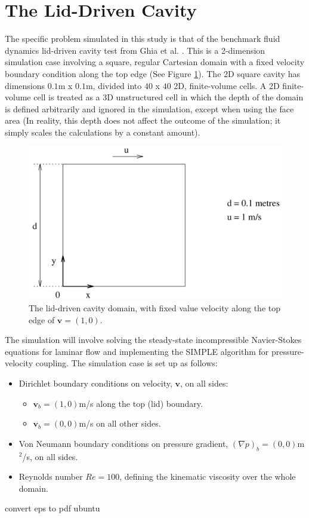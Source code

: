 \documentclass[final,3p,times,twocolumn]{elsarticle}
\begin{document}
\section{The Lid-Driven Cavity}
The specific problem simulated in this study is that of the benchmark fluid dynamics lid-driven cavity test from Ghia et al. \cite{Ghia1982High-ReMethod}. This is a 2-dimension simulation case involving a square, regular Cartesian domain with a fixed velocity boundary condition along the top edge (See Figure \ref{fig:lid-driven}). The 2D square cavity has dimensions $0.1$m x $0.1$m, divided into $40$ x $40$ 2D, finite-volume cells. A 2D finite-volume cell is treated as a 3D unstructured cell in which the depth of the domain is defined arbitrarily and ignored in the simulation, except when using the face area (In reality, this depth does not affect the outcome of the simulation; it simply scales the calculations by a constant amount).
\begin{figure}[ht]
    \centering
    \includegraphics[width=\linewidth]{Report/images/lid-driven-cavity.png}
    \caption{The lid-driven cavity domain, with fixed value velocity along the top edge of $\mathbf{v} = (1,0)$. }
    \label{fig:lid-driven}
\end{figure}

The simulation will involve solving the steady-state incompressible Navier-Stokes equations for laminar flow and implementing the SIMPLE algorithm for pressure-velocity coupling. The simulation case is set up as follows:
\begin{itemize}
    \item Dirichlet boundary conditions on velocity, $\mathbf{v}$, on all sides:
    \begin{itemize}
        \item $\mathbf{v}_b = (1,0)$m/s along the top (lid) boundary.
        \item $\mathbf{v}_b = (0,0)$m/s on all other sides.
    \end{itemize}
    \item Von Neumann boundary conditions on pressure gradient, $(\nabla p)_b = (0,0)$m$^2$/s, on all sides.
    \item Reynolds number $Re = 100$, defining the kinematic viscosity over the whole domain.
\end{itemize}
convert eps to pdf ubuntu
\end{document}
